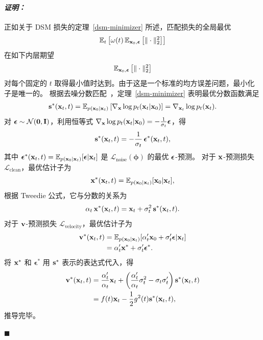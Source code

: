 \paragraph{\textit{证明：}} 
正如关于 DSM 损失的定理~\ref{dsm-minimizer} 所述，匹配损失的全局最优
\[
\mathbb{E}_t\left[\omega(t)\,\mathbb{E}_{{\mathbf{x}}_0,\bm{\epsilon}}\left[\|\cdot\|_2^2\right]\right]
\]
在如下内层期望
\[
\mathbb{E}_{{\mathbf{x}}_0,\bm{\epsilon}}\left[\|\cdot\|_2^2\right]
\]
对每个固定的 $t$ 取得最小值时达到。由于这是一个标准的均方误差问题，最小化子是唯一的。
根据去噪分数匹配~\citep{vincent2011connection}，定理~\ref{dsm-minimizer} 表明最优分数函数满足
\begin{align*}
    {\mathbf{s}}^*({\mathbf{x}}_t,t) = \mathbb{E}_{p({\mathbf{x}}_0|{\mathbf{x}}_t)}\left[\nabla_{{\mathbf{x}}}\log p_t({\mathbf{x}}_t|{\mathbf{x}}_0)\right] = \nabla_{{\mathbf{x}}_t} \log p_t({\mathbf{x}}_t).
\end{align*}
对 $\bm{\epsilon} \sim \mathcal{N}(\bm{0},{\mathbf{I}})$，利用恒等式 $\nabla_{{\mathbf{x}}}\log p_t({\mathbf{x}}_t|{\mathbf{x}}_0) = -\frac{1}{\sigma_t} \bm{\epsilon}$，得
\begin{align*}
    {\mathbf{s}}^*({\mathbf{x}}_t,t) = -\frac{1}{\sigma_t}\, \bm{\epsilon}^*({\mathbf{x}}_t,t),
\end{align*}
其中 $\bm{\epsilon}^*({\mathbf{x}}_t,t) = \mathbb{E}_{p({\mathbf{x}}_0|{\mathbf{x}}_t)}[\bm{\epsilon}|{\mathbf{x}}_t]$ 是 $\mathcal{L}_{\text{noise}}({\bm{\phi}})$ 的最优 ${\bm{\epsilon}}$-预测。
对于 ${\mathbf{x}}$-预测损失 $\mathcal{L}_{\text{clean}}$，最优估计子为
\[
{\mathbf{x}}^*({\mathbf{x}}_t,t) = \mathbb{E}_{p({\mathbf{x}}_0|{\mathbf{x}}_t)}[{\mathbf{x}}_0|{\mathbf{x}}_t],
\]
根据 Tweedie 公式，它与分数的关系为
\[
\alpha_t\, {\mathbf{x}}^*({\mathbf{x}}_t,t) = {\mathbf{x}}_t + \sigma_t^2\, {\mathbf{s}}^*({\mathbf{x}}_t,t).
\]
对于 ${\mathbf{v}}$-预测损失 $\mathcal{L}_{\text{velocity}}$，最优估计子为
\begin{align*}
    {\mathbf{v}}^*({\mathbf{x}}_t,t) &= \mathbb{E}_{p({\mathbf{x}}_0|{\mathbf{x}}_t)}[\alpha_t' {\mathbf{x}}_0 + \sigma_t' \bm{\epsilon}|{\mathbf{x}}_t] \\
    &= \alpha_t' {\mathbf{x}}^* + \sigma_t' \bm{\epsilon}^*.
\end{align*}
将 ${\mathbf{x}}^*$ 和 $\bm{\epsilon}^*$ 用 ${\mathbf{s}}^*$ 表示的表达式代入，得
\begin{align*}
    {\mathbf{v}}^*({\mathbf{x}}_t,t)
    &= \frac{\alpha_t'}{\alpha_t} {\mathbf{x}}_t + \left( \frac{\alpha_t'}{\alpha_t} \sigma_t^2 - \sigma_t \sigma_t' \right) {\mathbf{s}}^*({\mathbf{x}}_t,t) \\
    &= f(t) {\mathbf{x}}_t - \frac{1}{2}g^2(t) {\mathbf{s}}^*({\mathbf{x}}_t,t),
\end{align*}
推导完毕。


\hfill$\blacksquare$



\clearpage
\newpage


